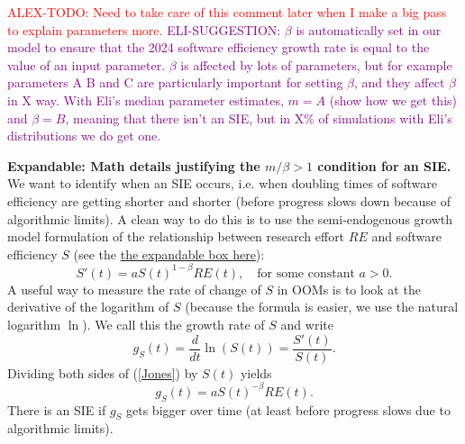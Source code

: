\documentclass{article}
\theoremstyle{definition}
\newcommand{\ESUG}[1]{\textcolor{purple}{ELI-SUGGESTION: #1}}
\newcommand{\ATODO}[1]{\textcolor{red}{ALEX-TODO: #1}}
\begin{document}

\ATODO{Need to take care of this comment later when I make a big pass to explain parameters more.}
\ESUG{$\beta$ is automatically set in our model to ensure that the 2024 software efficiency growth rate is equal to the value of an input parameter. $\beta$ is affected by lots of parameters, but for example parameters A B and C are particularly important for setting $\beta$, and they affect $\beta$ in X way. With Eli's median parameter estimates, $m=A$ (show how we get this) and $\beta=B$, meaning that there isn't an SIE, but in X\% of simulations with Eli's distributions we do get one.}

\textbf{Expandable: Math details justifying the $m/\beta > 1$ condition for an SIE.} We want to identify when an SIE occurs, i.e. when doubling times of software efficiency are getting shorter and shorter (before progress slows down because of algorithmic limits). A clean way to do this is to use the semi-endogenous growth model formulation of the relationship between research effort $RE$ and software efficiency $S$ (see the \hyperref[Jones model]{the expandable box here}):
\begin{equation} \label{Jones}
S'(t) = a S(t)^{1-\beta} RE(t), \quad \text{for some constant $a > 0$}.
\end{equation}
A useful way to measure the rate of change of $S$ in OOMs is to look at the derivative of the logarithm of $S$ (because the formula is easier, we use the natural logarithm $\ln$). We call this the growth rate of $S$ and write
\[ g_S(t) = \frac{d}{dt} \ln(S(t)) = \frac{S'(t)}{S(t)}.\]
Dividing both sides of (\ref{Jones}) by $S(t)$ yields
\begin{equation} \label{gS}
g_S(t) = a S(t)^{-\beta} RE(t).
\end{equation}
There is an SIE if $g_S$ gets bigger over time (at least before progress slows due to algorithmic limits).
\end{document}
